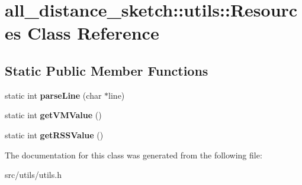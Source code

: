 \hypertarget{classall__distance__sketch_1_1utils_1_1Resources}{}\section{all\+\_\+distance\+\_\+sketch\+:\+:utils\+:\+:Resources Class Reference}
\label{classall__distance__sketch_1_1utils_1_1Resources}
\subsection*{Static Public Member Functions}
\begin{DoxyCompactItemize}
\item 
\hypertarget{classall__distance__sketch_1_1utils_1_1Resources_ad55265160c6cb64586f6ee6c0341db96}{}static int {\bfseries parse\+Line} (char $\ast$line)\label{classall__distance__sketch_1_1utils_1_1Resources_ad55265160c6cb64586f6ee6c0341db96}

\item 
\hypertarget{classall__distance__sketch_1_1utils_1_1Resources_a8bfd6e4264b766b548a73f607bda08a6}{}static int {\bfseries get\+V\+M\+Value} ()\label{classall__distance__sketch_1_1utils_1_1Resources_a8bfd6e4264b766b548a73f607bda08a6}

\item 
\hypertarget{classall__distance__sketch_1_1utils_1_1Resources_a4925469f821d488dd5b5d11feefd33b1}{}static int {\bfseries get\+R\+S\+S\+Value} ()\label{classall__distance__sketch_1_1utils_1_1Resources_a4925469f821d488dd5b5d11feefd33b1}

\end{DoxyCompactItemize}


The documentation for this class was generated from the following file\+:\begin{DoxyCompactItemize}
\item 
src/utils/utils.\+h\end{DoxyCompactItemize}
